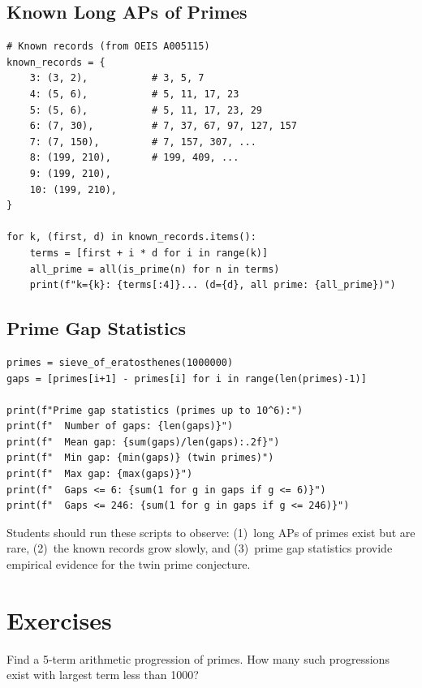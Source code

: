 \subsection{Known Long APs of Primes}

\begin{verbatim}
# Known records (from OEIS A005115)
known_records = {
    3: (3, 2),           # 3, 5, 7
    4: (5, 6),           # 5, 11, 17, 23
    5: (5, 6),           # 5, 11, 17, 23, 29
    6: (7, 30),          # 7, 37, 67, 97, 127, 157
    7: (7, 150),         # 7, 157, 307, ...
    8: (199, 210),       # 199, 409, ...
    9: (199, 210),
    10: (199, 210),
}

for k, (first, d) in known_records.items():
    terms = [first + i * d for i in range(k)]
    all_prime = all(is_prime(n) for n in terms)
    print(f"k={k}: {terms[:4]}... (d={d}, all prime: {all_prime})")
\end{verbatim}

\subsection{Prime Gap Statistics}

\begin{verbatim}
primes = sieve_of_eratosthenes(1000000)
gaps = [primes[i+1] - primes[i] for i in range(len(primes)-1)]

print(f"Prime gap statistics (primes up to 10^6):")
print(f"  Number of gaps: {len(gaps)}")
print(f"  Mean gap: {sum(gaps)/len(gaps):.2f}")
print(f"  Min gap: {min(gaps)} (twin primes)")
print(f"  Max gap: {max(gaps)}")
print(f"  Gaps <= 6: {sum(1 for g in gaps if g <= 6)}")
print(f"  Gaps <= 246: {sum(1 for g in gaps if g <= 246)}")
\end{verbatim}

\begin{highlightbox}
Students should run these scripts to observe: (1)~long APs of primes exist but are rare, (2)~the known records grow slowly, and (3)~prime gap statistics provide empirical evidence for the twin prime conjecture.
\end{highlightbox}

\section{Exercises}

\begin{exercise}[Basic]
Find a 5-term arithmetic progression of primes. How many such progressions exist with largest term less than 1000?
\end{exercise}

